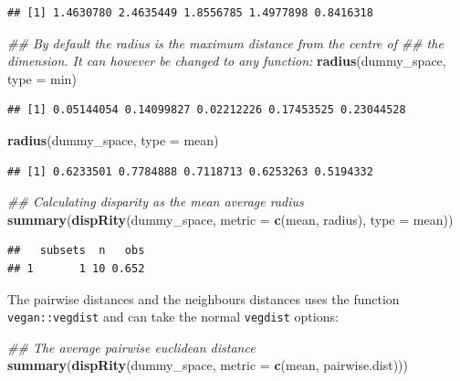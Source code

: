 \documentclass[]{book}
\newenvironment{Shaded}{\begin{snugshade}}{\end{snugshade}}
\newcommand{\CommentTok}[1]{\textcolor[rgb]{0.56,0.35,0.01}{\textit{#1}}}
\newcommand{\DataTypeTok}[1]{\textcolor[rgb]{0.13,0.29,0.53}{#1}}
\newcommand{\KeywordTok}[1]{\textcolor[rgb]{0.13,0.29,0.53}{\textbf{#1}}}
\newcommand{\NormalTok}[1]{#1}
\begin{document}
\begin{verbatim}
## [1] 1.4630780 2.4635449 1.8556785 1.4977898 0.8416318
\end{verbatim}

\begin{Shaded}
\begin{Highlighting}[]
\CommentTok{## By default the radius is the maximum distance from the centre of}
\CommentTok{## the dimension. It can however be changed to any function:}
\KeywordTok{radius}\NormalTok{(dummy_space, }\DataTypeTok{type =}\NormalTok{ min)}
\end{Highlighting}
\end{Shaded}

\begin{verbatim}
## [1] 0.05144054 0.14099827 0.02212226 0.17453525 0.23044528
\end{verbatim}

\begin{Shaded}
\begin{Highlighting}[]
\KeywordTok{radius}\NormalTok{(dummy_space, }\DataTypeTok{type =}\NormalTok{ mean)}
\end{Highlighting}
\end{Shaded}

\begin{verbatim}
## [1] 0.6233501 0.7784888 0.7118713 0.6253263 0.5194332
\end{verbatim}

\begin{Shaded}
\begin{Highlighting}[]
\CommentTok{## Calculating disparity as the mean average radius}
\KeywordTok{summary}\NormalTok{(}\KeywordTok{dispRity}\NormalTok{(dummy_space,}
                 \DataTypeTok{metric =} \KeywordTok{c}\NormalTok{(mean, radius),}
                 \DataTypeTok{type =}\NormalTok{ mean))}
\end{Highlighting}
\end{Shaded}

\begin{verbatim}
##   subsets  n   obs
## 1       1 10 0.652
\end{verbatim}

The pairwise distances and the neighbours distances uses the function \texttt{vegan::vegdist} and can take the normal \texttt{vegdist} options:

\begin{Shaded}
\begin{Highlighting}[]
\CommentTok{## The average pairwise euclidean distance}
\KeywordTok{summary}\NormalTok{(}\KeywordTok{dispRity}\NormalTok{(dummy_space, }\DataTypeTok{metric =} \KeywordTok{c}\NormalTok{(mean, pairwise.dist)))}
\end{Highlighting}
\end{Shaded}
\end{document}
